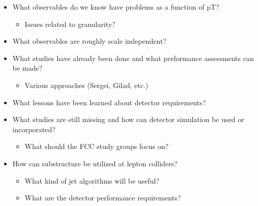 \label{superboosted}

\begin{itemize}
\item What observables do we know have problems as a function of pT?
\begin{itemize}
	\item Issues related to granularity?
\end{itemize}
\item What observables are roughly scale independent?
\item What studies have already been done and what performance assessments can be made?
\begin{itemize}
	\item Various approaches (Sergei, Gilad, etc.)
\end{itemize}
\item What lessons have been learned about detector requirements?
\item What studies are still missing and how can detector simulation be used or incorporated?
\begin{itemize}
	\item What should the FCC study groups focus on?
\end{itemize}
\item How can substructure be utilized at lepton colliders?
\begin{itemize}
 	\item What kind of jet algorithms will be useful?
 	\item What are the detector performance requirements?
 \end{itemize} 
\end{itemize}